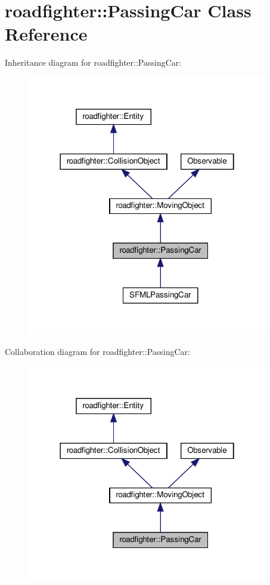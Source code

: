 \hypertarget{classroadfighter_1_1PassingCar}{}\section{roadfighter\+:\+:Passing\+Car Class Reference}
\label{classroadfighter_1_1PassingCar}


Inheritance diagram for roadfighter\+:\+:Passing\+Car\+:\nopagebreak
\begin{figure}[H]
\begin{center}
\leavevmode
\includegraphics[width=298pt]{classroadfighter_1_1PassingCar__inherit__graph}
\end{center}
\end{figure}


Collaboration diagram for roadfighter\+:\+:Passing\+Car\+:\nopagebreak
\begin{figure}[H]
\begin{center}
\leavevmode
\includegraphics[width=298pt]{classroadfighter_1_1PassingCar__coll__graph}
\end{center}
\end{figure}

